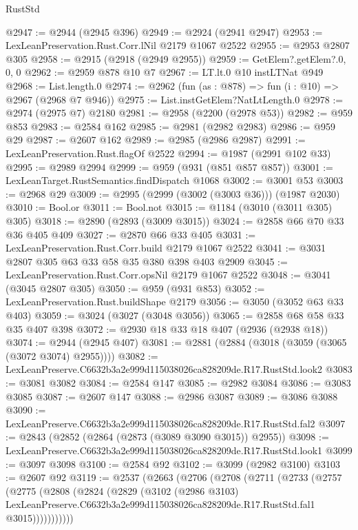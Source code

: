 \begin{lexlean}{RustStd}
\begin{coremodule}
@2947 := @2944 (@2945 @396)
@2949 := @2924 (@2941 @2947)
@2953 := LexLeanPreservation.Rust.Corr.lNil @2179 @1067 @2522
@2955 := @2953 @2807 @305
@2958 := @2915 (@2918 (@2949 @2955))
@2959 := GetElem?.getElem?.{0, 0, 0}
@2962 := @2959 @878 @10 @7
@2967 := LT.lt.{0} @10 instLTNat @949
@2968 := List.length.{0}
@2974 := @2962 (fun (as : @878) => fun (i : @10) => @2967 (@2968 @7 @946))
@2975 := List.instGetElem?NatLtLength.{0}
@2978 := @2974 (@2975 @7) @2180
@2981 := @2958 (@2200 (@2978 @53))
@2982 := @959 @853
@2983 := @2584 @162
@2985 := @2981 (@2982 @2983)
@2986 := @959 @29
@2987 := @2607 @162
@2989 := @2985 (@2986 @2987)
@2991 := LexLeanPreservation.Rust.flagOf @2522
@2994 := @1987 (@2991 @102 @33)
@2995 := @2989 @2994
@2999 := @959 (@931 (@851 @857 @857))
@3001 := LexLeanTarget.RustSemantics.findDispatch @1068
@3002 := @3001 @53
@3003 := @2968 @29
@3009 := @2995 (@2999 (@3002 (@3003 @36))) (@1987 @2030)
@3010 := Bool.or
@3011 := Bool.not
@3015 := @1184 (@3010 (@3011 @305) @305)
@3018 := @2890 (@2893 (@3009 @3015))
@3024 := @2858 @66 @70 @33 @36 @405 @409
@3027 := @2870 @66 @33 @405
@3031 := LexLeanPreservation.Rust.Corr.build @2179 @1067 @2522
@3041 := @3031 @2807 @305 @63 @33 @58 @35 @380 @398 @403 @2909
@3045 := LexLeanPreservation.Rust.Corr.opsNil @2179 @1067 @2522
@3048 := @3041 (@3045 @2807 @305)
@3050 := @959 (@931 @853)
@3052 := LexLeanPreservation.Rust.buildShape @2179
@3056 := @3050 (@3052 @63 @33 @403)
@3059 := @3024 (@3027 (@3048 @3056))
@3065 := @2858 @68 @58 @33 @35 @407 @398
@3072 := @2930 @18 @33 @18 @407 (@2936 (@2938 @18))
@3074 := @2944 (@2945 @407)
@3081 := @2881 (@2884 (@3018 (@3059 (@3065 (@3072 @3074) @2955))))
@3082 := LexLeanPreserve.C6632b3a2e999d115038026ca828209de.R17.RustStd.look2
@3083 := @3081 @3082
@3084 := @2584 @147
@3085 := @2982 @3084
@3086 := @3083 @3085
@3087 := @2607 @147
@3088 := @2986 @3087
@3089 := @3086 @3088
@3090 := LexLeanPreserve.C6632b3a2e999d115038026ca828209de.R17.RustStd.fal2
@3097 := @2843 (@2852 (@2864 (@2873 (@3089 @3090 @3015)) @2955))
@3098 := LexLeanPreserve.C6632b3a2e999d115038026ca828209de.R17.RustStd.look1
@3099 := @3097 @3098
@3100 := @2584 @92
@3102 := @3099 (@2982 @3100)
@3103 := @2607 @92
@3119 := @2537
    (@2663
      (@2706
        (@2708
          (@2711
            (@2733
              (@2757
                (@2775
                  (@2808
                    (@2824
                      (@2829
                        (@3102
                          (@2986 @3103)
                          LexLeanPreserve.C6632b3a2e999d115038026ca828209de.R17.RustStd.fal1
                          @3015)))))))))))

\end{coremodule}
\end{lexlean}
